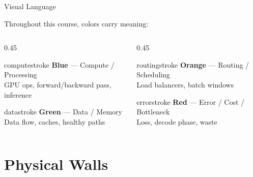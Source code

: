 \documentclass[aspectratio=169, 12pt]{beamer}
\begin{document}
\begin{frame}{Visual Language}
\note{
%
%
}

\small
Throughout this course, colors carry meaning:

\vspace{0.3cm}
\begin{columns}[T]
  \begin{column}{0.45\textwidth}
    \begin{mlsyscard}{computestroke}
    \textbf{Blue} --- Compute / Processing\\
    {\footnotesize GPU ops, forward/backward pass, inference}
    \end{mlsyscard}
    \vspace{0.15cm}
    \begin{mlsyscard}{datastroke}
    \textbf{Green} --- Data / Memory\\
    {\footnotesize Data flow, caches, healthy paths}
    \end{mlsyscard}
  \end{column}
  \begin{column}{0.45\textwidth}
    \begin{mlsyscard}{routingstroke}
    \textbf{Orange} --- Routing / Scheduling\\
    {\footnotesize Load balancers, batch windows}
    \end{mlsyscard}
    \vspace{0.15cm}
    \begin{mlsyscard}{errorstroke}
    \textbf{Red} --- Error / Cost / Bottleneck\\
    {\footnotesize Loss, decode phase, waste}
    \end{mlsyscard}
  \end{column}
\end{columns}
\end{frame}


\section{Physical Walls}
\end{document}

